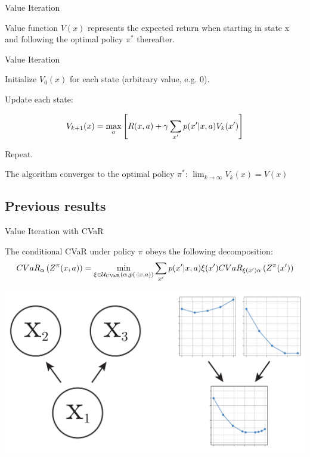 \documentclass{beamer}
\begin{document}
\begin{frame}{Value Iteration}

\begin{definition}

Value function $V(x)$ represents the expected return when starting in state x and following the optimal policy $\pi^*$ thereafter.

\end{definition}

\begin{block}{Value Iteration}

Initialize $V_0(x)$ for each state (arbitrary value, e.g. 0).

Update each state:

$$V_{k+1}(x) = \max_a \left[ {R(x, a) + \gamma\sum_{x'}  p(x'|x, a) V_k(x')} \right]$$

Repeat.
\end{block}

The algorithm converges to the optimal policy $\pi^*$: $\lim_{k\to\infty}V_k(x) = V(x)$

\end{frame}


\subsection{Previous results}

\begin{frame}{Value Iteration with CVaR}

\begin{theorem}
The conditional CVaR under policy $\pi$ obeys the following decomposition:
$$CVaR_\alpha\left( {Z^\pi(x, a)} \right) = \min_{\xi \in \mathcal{U}_{\text{CVaR}}(\alpha, p(\cdot | x, a))} \sum_{x'} p(x'| x, a)\xi(x') CVaR_{\xi(x')\alpha}\left( {Z^\pi(x')} \right)$$
\end{theorem}
\center
\includegraphics[width=0.75\linewidth]{gfx/acvara_mixture.pdf}
\end{frame}
\end{document}
